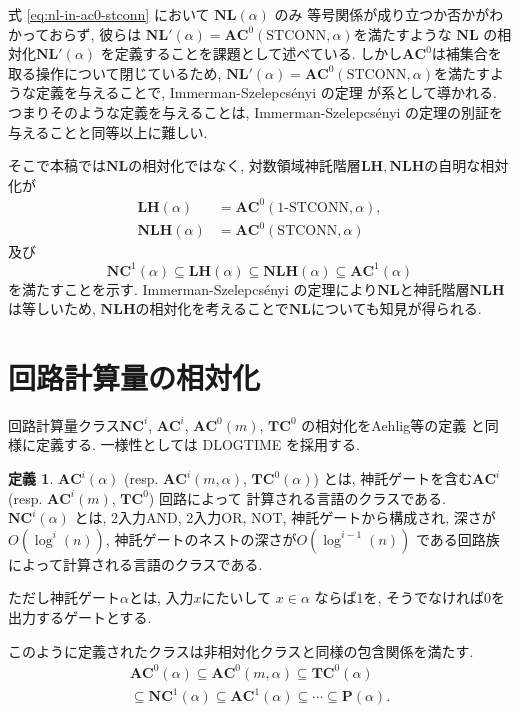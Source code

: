 \documentclass[10pt,a4paper,twocolumn]{jarticle}
\theoremstyle{definition}
\newtheorem{definition}[theorem]{定義}
\theoremstyle{remark}
\newcommand{\classfont}{\mathbf}
\newcommand{\AC}{\classfont{AC}}
\newcommand{\TC}{\classfont{TC}}
\newcommand{\NC}{\classfont{NC}}
\newcommand{\NL}{\classfont{NL}}
\renewcommand{\P}{\classfont{P}}
\newcommand{\LH}{\classfont{LH}}
\newcommand{\NLH}{\classfont{NLH}}
\newcommand{\probfont}{\text}
\newcommand{\oneSTCONN}{\probfont{1-STCONN}}
\newcommand{\STCONN}{\probfont{STCONN}}
\begin{document}
式 \eqref{eq:nl-in-ac0-stconn} において $\NL(\alpha)$ のみ
等号関係が成り立つか否かがわかっておらず, 
彼らは $\NL'(\alpha) = \AC^0(\STCONN, \alpha)$を満たすような
$\NL$ の相対化$\NL'(\alpha)$ を定義することを課題として述べている.
しかし$\AC^0$は補集合を取る操作について閉じているため,
$\NL'(\alpha) = \AC^0(\STCONN, \alpha)$を満たすような定義を与えることで,
Immerman-Szelepcs{\'e}nyi の定理 
\cite{immerman1988nondeterministic,szelepcsenyi1988method}
が系として導かれる.
つまりそのような定義を与えることは,
Immerman-Szelepcs{\'e}nyi の定理の別証を与えることと同等以上に難しい.


そこで本稿では$\NL$の相対化ではなく,
対数領域神託階層$\LH, \NLH$の自明な相対化が
\begin{align*}
 \LH(\alpha) &= \AC^0 (\oneSTCONN, \alpha),
 \\
 \NLH(\alpha) &= \AC^0(\STCONN, \alpha)
\end{align*}
及び
\begin{equation*}
 \NC^1(\alpha) \subseteq \LH(\alpha) \subseteq \NLH(\alpha) \subseteq \AC^1(\alpha)
\end{equation*}
を満たすことを示す.
Immerman-Szelepcs{\'e}nyi の定理により$\NL$と神託階層$\NLH$は等しいため,
$\NLH$の相対化を考えることで$\NL$についても知見が得られる.


\section{回路計算量の相対化}

回路計算量クラス$\NC^i$, $\AC^i$, $\AC^0(m)$, $\TC^0$ の相対化をAehlig等の定義
\cite{aehlig2007relativizing} と同様に定義する.
一様性としては DLOGTIME を採用する.
\begin{definition}
$\AC^i(\alpha)$ (resp. $\AC^i(m, \alpha)$, $\TC^0(\alpha)$) とは,
神託ゲートを含む$\AC^i$ (resp. $\AC^i(m)$, $\TC^0$) 回路によって
計算される言語のクラスである.
$\NC^i(\alpha)$ とは, 2入力AND, 2入力OR, NOT, 神託ゲートから構成され,
深さが$O(\log^i(n))$, 神託ゲートのネストの深さが$O(\log^{i-1}(n))$
である回路族によって計算される言語のクラスである.
\end{definition}
ただし神託ゲート$\alpha$とは, 入力$x$にたいして $x \in \alpha$ ならば$1$を, 
そうでなければ$0$を出力するゲートとする.

このように定義されたクラスは非相対化クラスと同様の包含関係を満たす.
\begin{gather*}
 \AC^0(\alpha) \subseteq \AC^0(m, \alpha) \subseteq \TC^0(\alpha) \\
 \subseteq \NC^1(\alpha) \subseteq \AC^1(\alpha) \subseteq \cdots \subseteq \P(\alpha).
\end{gather*}
\end{document}
